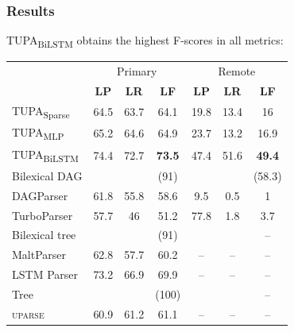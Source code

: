 \documentclass[t]{beamer}
\newcommand{\parser}[1]{TUPA\textsubscript{#1}}
\begin{document}
\begin{frame}
\frametitle{Results}
\parser{BiLSTM} obtains the highest F-scores in all metrics:
\begin{center}
	\begin{tabular}{l|ccc|ccc}
		& \multicolumn{3}{c|}{Primary} & \multicolumn{3}{c}{Remote} \\
		& \textbf{LP} & \textbf{LR} & \textbf{LF} & \textbf{LP} & \textbf{LR} & \textbf{LF} \\
		\hline
		\parser{Sparse}
		& 64.5 & 63.7 & 64.1 & 19.8 & 13.4 & 16 \\
		\parser{MLP}
		& 65.2 & 64.6 & 64.9 & 23.7 & 13.2 & 16.9 \\
		\parser{BiLSTM}
		& 74.4 & 72.7 & \textbf{73.5} & 47.4 & 51.6 & \textbf{49.4} \\
		\hline
		\footnotesize Bilexical DAG
		& & & \small (91) & & & \small (58.3) \\
		DAGParser
		& 61.8 & 55.8 & 58.6 & 9.5 & 0.5 & 1 \\
		TurboParser
		& 57.7 & 46 & 51.2 & 77.8 & 1.8 & 3.7 \\
		\hline
		\footnotesize Bilexical tree
		& & & \footnotesize (91) & & & \footnotesize -- \\
		MaltParser
		& 62.8 & 57.7 & 60.2 & -- & -- & -- \\
		LSTM Parser
		& 73.2 & 66.9 & 69.9 & -- & -- & -- \\
		\hline
		\footnotesize Tree
		& & & \small (100) & & & \small -- \\
		\textsc{uparse}
		& 60.9 & 61.2 & 61.1 & -- & -- & --
	\end{tabular}
\end{center}
\end{frame}
\end{document}
